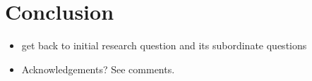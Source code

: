 \chapter{Conclusion}
\label{chap:conclusion}

\begin{itemize}
  \item
    get back to initial research question and its subordinate questions
  \item
    Acknowledgements? See comments.
\end{itemize}
